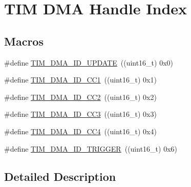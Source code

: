\hypertarget{group___t_i_m___d_m_a___handle__index}{\section{T\-I\-M D\-M\-A Handle Index}
\label{group___t_i_m___d_m_a___handle__index}
}
\subsection*{Macros}
\begin{DoxyCompactItemize}
\item 
\#define \hyperlink{group___t_i_m___d_m_a___handle__index_ga15f38cee11f8b2b5a85cbf4552ba140d}{T\-I\-M\-\_\-\-D\-M\-A\-\_\-\-I\-D\-\_\-\-U\-P\-D\-A\-T\-E}~((uint16\-\_\-t) 0x0)
\item 
\#define \hyperlink{group___t_i_m___d_m_a___handle__index_ga7ca691eb5e29b0206d3390cc6e90079a}{T\-I\-M\-\_\-\-D\-M\-A\-\_\-\-I\-D\-\_\-\-C\-C1}~((uint16\-\_\-t) 0x1)
\item 
\#define \hyperlink{group___t_i_m___d_m_a___handle__index_ga9c52f32d4bd21dd2d232900219f0a111}{T\-I\-M\-\_\-\-D\-M\-A\-\_\-\-I\-D\-\_\-\-C\-C2}~((uint16\-\_\-t) 0x2)
\item 
\#define \hyperlink{group___t_i_m___d_m_a___handle__index_ga6e8145f305b54744bf2ef379a4315a40}{T\-I\-M\-\_\-\-D\-M\-A\-\_\-\-I\-D\-\_\-\-C\-C3}~((uint16\-\_\-t) 0x3)
\item 
\#define \hyperlink{group___t_i_m___d_m_a___handle__index_ga1860c00b370435ff40d9e65f14a61706}{T\-I\-M\-\_\-\-D\-M\-A\-\_\-\-I\-D\-\_\-\-C\-C4}~((uint16\-\_\-t) 0x4)
\item 
\#define \hyperlink{group___t_i_m___d_m_a___handle__index_ga39900e5227e4d813a726a1df5d86671c}{T\-I\-M\-\_\-\-D\-M\-A\-\_\-\-I\-D\-\_\-\-T\-R\-I\-G\-G\-E\-R}~((uint16\-\_\-t) 0x6)
\end{DoxyCompactItemize}


\subsection{Detailed Description}


